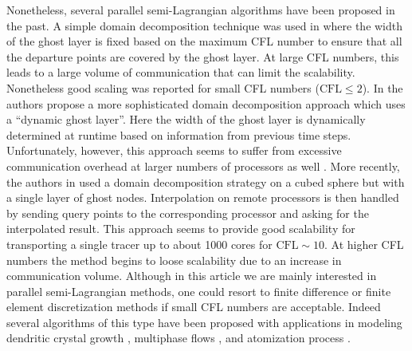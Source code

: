 Nonetheless, several parallel semi-Lagrangian algorithms have been proposed in the past. A simple domain decomposition technique was used in \cite{Thomas;Cote:95:Massively-parallel-s} where the width of the ghost layer is fixed based on the maximum CFL number to ensure that all the departure points are covered by the ghost layer. At large CFL numbers, this leads to a large volume of communication that can limit the scalability. Nonetheless good scaling was reported for small CFL numbers ($\text{CFL} \le 2$). In \cite{Drake;Foster;Michalakes;etal:95:Design-and-performan} the authors propose a more sophisticated domain decomposition approach which uses a ``dynamic ghost layer''. Here the width of the ghost layer is dynamically determined at runtime based on information from previous time steps. Unfortunately, however, this approach seems to suffer from excessive communication overhead at larger numbers of processors as well . More recently, the authors in \cite{White-III;Dongarra:11:High-performance-hig} used a domain decomposition strategy on a cubed sphere but with a single layer of ghost nodes. Interpolation on remote processors is then handled by sending query points to the corresponding processor and asking for the interpolated result. This approach seems to provide good scalability for transporting a single tracer up to about 1000 cores for $\text{CFL} \sim 10$. At higher CFL numbers the method begins to loose scalability due to an increase in communication volume. Although in this article we are mainly interested in parallel semi-Lagrangian methods, one could resort to finite difference or finite element discretization methods if small CFL numbers are acceptable. Indeed several algorithms of this type have been proposed with applications in modeling dendritic crystal growth \cite{Wang;Chang;Kale;etal:06:Parallelization-of-a}, multiphase flows \cite{Sussman:05:A-parallelized-adapt, Fortmeier;Bucker:11:A-parallel-strategy-, Rodriguez;Sahni;Lahey-Jr;etal:13:A-parallel-adaptive-}, and atomization process \cite{Herrmann:10:A-parallel-Eulerian-}.

